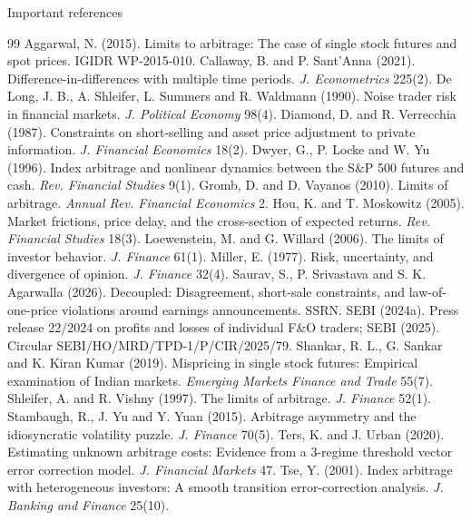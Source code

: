\documentclass[11pt]{beamer}
\begin{document}
\begin{frame}[allowframebreaks]{Important references}
  \tiny
  \begin{thebibliography}{99}
     Aggarwal, N. (2015). Limits to arbitrage: The case of single stock futures and spot prices. IGIDR WP-2015-010.
     Callaway, B. and P. Sant'Anna (2021). Difference-in-differences with multiple time periods. \emph{J. Econometrics} 225(2).
     De Long, J. B., A. Shleifer, L. Summers and R. Waldmann (1990). Noise trader risk in financial markets. \emph{J. Political Economy} 98(4).
     Diamond, D. and R. Verrecchia (1987). Constraints on short-selling and asset price adjustment to private information. \emph{J. Financial Economics} 18(2).
     Dwyer, G., P. Locke and W. Yu (1996). Index arbitrage and nonlinear dynamics between the S\&P 500 futures and cash. \emph{Rev. Financial Studies} 9(1).
     Gromb, D. and D. Vayanos (2010). Limits of arbitrage. \emph{Annual Rev. Financial Economics} 2.
     Hou, K. and T. Moskowitz (2005). Market frictions, price delay, and the cross-section of expected returns. \emph{Rev. Financial Studies} 18(3).
     Loewenstein, M. and G. Willard (2006). The limits of investor behavior. \emph{J. Finance} 61(1).
     Miller, E. (1977). Risk, uncertainty, and divergence of opinion. \emph{J. Finance} 32(4).
     Saurav, S., P. Srivastava and S. K. Agarwalla (2026). Decoupled: Disagreement, short-sale constraints, and law-of-one-price violations around earnings announcements. SSRN.
     SEBI (2024a). Press release 22/2024 on profits and losses of individual F\&O traders; SEBI (2025). Circular SEBI/HO/MRD/TPD-1/P/CIR/2025/79.
     Shankar, R. L., G. Sankar and K. Kiran Kumar (2019). Mispricing in single stock futures: Empirical examination of Indian markets. \emph{Emerging Markets Finance and Trade} 55(7).
     Shleifer, A. and R. Vishny (1997). The limits of arbitrage. \emph{J. Finance} 52(1).
     Stambaugh, R., J. Yu and Y. Yuan (2015). Arbitrage asymmetry and the idiosyncratic volatility puzzle. \emph{J. Finance} 70(5).
     Ters, K. and J. Urban (2020). Estimating unknown arbitrage costs: Evidence from a 3-regime threshold vector error correction model. \emph{J. Financial Markets} 47.
     Tse, Y. (2001). Index arbitrage with heterogeneous investors: A smooth transition error-correction analysis. \emph{J. Banking and Finance} 25(10).
  \end{thebibliography}
\end{frame}
\end{document}

